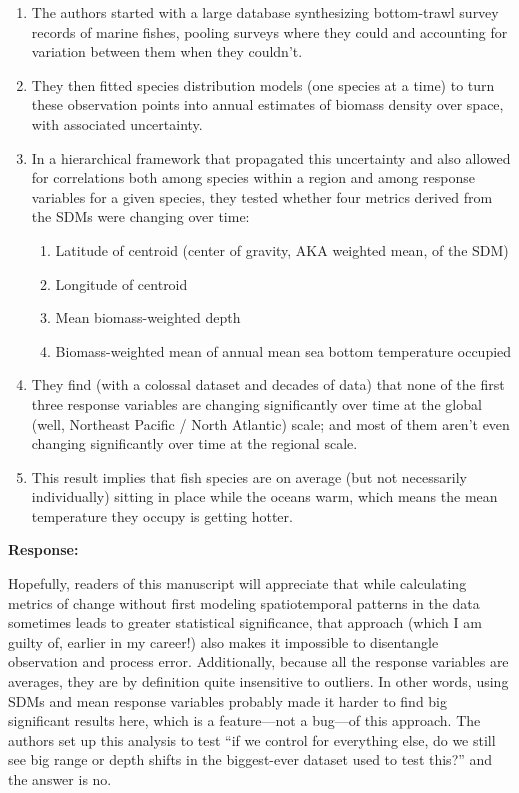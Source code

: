 \documentclass[11pt]{article}
\newcommand{\reviewer}[1]{\par\medskip\noindent\textcolor{revcolor}{#1}\par}
\newenvironment{reply}
{\par\smallskip\begingroup\color{replycolor}\noindent\textbf{Response:}\ }
{\endgroup\par\medskip}
\begin{document}
\reviewer{%
\begin{enumerate}
    \item The authors started with a large database synthesizing bottom-trawl
    survey records of marine fishes, pooling surveys where they could and
    accounting for variation between them when they couldn't.
    \item They then fitted species distribution models (one species at a time) to
    turn these observation points into annual estimates of biomass density over
    space, with associated uncertainty.
    \item In a hierarchical framework that propagated this uncertainty and also
    allowed for correlations both among species within a region and among response
    variables for a given species, they tested whether four metrics derived from
    the SDMs were changing over time:
    \begin{enumerate}
        \item Latitude of centroid (center of gravity, AKA weighted mean, of the SDM)
        \item Longitude of centroid
        \item Mean biomass-weighted depth
        \item Biomass-weighted mean of annual mean sea bottom temperature occupied
    \end{enumerate}
    \item They find (with a colossal dataset and decades of data) that none of the
    first three response variables are changing significantly over time at the
    global (well, Northeast Pacific / North Atlantic) scale; and most of them
    aren't even changing significantly over time at the regional scale.
    \item This result implies that fish species are on average (but not necessarily
    individually) sitting in place while the oceans warm, which means the mean
    temperature they occupy is getting hotter.
\end{enumerate}}

\begin{reply}

\end{reply}

\reviewer{Hopefully, readers of this manuscript will appreciate that while
calculating metrics of change without first modeling spatiotemporal patterns in the
data sometimes leads to greater statistical significance, that approach (which I am
guilty of, earlier in my career!) also makes it impossible to disentangle
observation and process error. Additionally, because all the response variables are
averages, they are by definition quite insensitive to outliers. In other words,
using SDMs and mean response variables probably made it harder to find big
significant results here, which is a feature---not a bug---of this approach. The
authors set up this analysis to test ``if we control for everything else, do we
still see big range or depth shifts in the biggest-ever dataset used to test
this?'' and the answer is no.}
\end{document}

